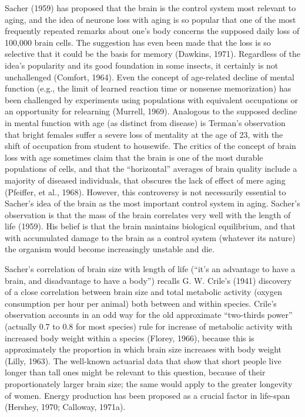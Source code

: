 Sacher (1959) has proposed that the brain is the control system most relevant to aging, and the idea of neurone loss with aging is so popular that one of the most frequently repeated remarks about one's body
concerns the supposed daily loss of 100,000 brain cells. The suggestion has even been made that the loss is so selective that it could be the basis for memory (Dawkins, 1971). Regardless of the idea's popularity
and its good foundation in some insects, it certainly is not unchallenged (Comfort, 1964). Even the concept of age-related decline of mental function (e.g., the limit of learned reaction time or nonsense memorization) has
been challenged by experiments using populations with equivalent occupations or an opportunity for relearning (Murrell, 1969). Analogous to the supposed decline in mental function with age (as distinct
from disease) is Terman's observation that bright females suffer a severe loss of mentality at the age of 23, with the shift of occupation from student to housewife. The critics of the concept of brain loss with age
sometimes claim that the brain is one of the most durable populations of cells, and that the ``horizontal'' averages of brain quality include a majority of diseased individuals, that obscures the lack of effect
of mere aging (Pfeiffer, et al., 1968). However, this controversy is not necessarily essential to Sacher's idea of the brain as the most important control system in aging. Sacher's observation is that the mass of the brain
correlates very well with the length of life (1959). His belief is that the brain maintains biological equilibrium, and that with accumulated damage to the brain as a control system (whatever its nature) the organism
would become increasingly unstable and die.

Sacher's correlation of brain size with length of life (``it's an advantage to have a brain, and disadvantage to have a body'') recalls G. W. Crile's (1941) discovery of a close correlation between brain size and total
metabolic activity (oxygen consumption per hour per animal) both between and within species. Crile's observation accounts in an odd way for the old approximate ``two-thirds power'' (actually 0.7 to 0.8 for most species) rule
for increase of metabolic activity with increased body weight within a species (Florey, 1966), because this is approximately the proportion in which brain size increases with body weight (Lilly, 1963). The
well-known actuarial data that show that short people live longer than tall ones might be relevant to this question, because of their proportionately larger brain size; the same would apply to the greater
longevity of women. Energy production has been proposed as a crucial factor in life-span (Hershey, 1970; Calloway, 1971a).

